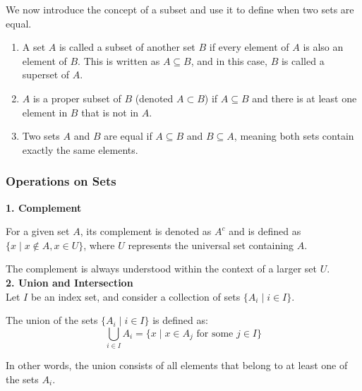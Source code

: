 We now introduce the concept of a subset and use it to define when two sets are equal.

\begin{definition} 
    \begin{enumerate}
        \item A set \( A \) is called a subset of another set \( B \) if every element of \( A \) is also an element of \( B \). This is written as \( A \subseteq B \), and in this case, \( B \) is called a superset of \( A \). 
        \item \( A \) is a proper subset of \( B \) (denoted \( A \subset B \)) if \( A \subseteq B \) and there is at least one element in \( B \) that is not in \( A \).  
        \item Two sets \( A \) and \( B \) are equal if \( A \subseteq B \) and \( B \subseteq A \), meaning both sets contain exactly the same elements.\\   
    \end{enumerate}
\end{definition}

\subsubsection{Operations on Sets}
\vspace{5pt}

\textbf{1. Complement}

\begin{definition}
    For a given set \(A\), its complement is denoted as \(A^c\) and is defined as \(\{x \mid x \notin A, x \in U\}\), where \(U\) represents the universal set containing \(A\). 
\end{definition}

The complement is always understood within the context of a larger set \(U\). \\

\textbf{2. Union and Intersection} \\

Let \(I\) be an index set, and consider a collection of sets \(\{A_i \mid i \in I\}\).

\begin{definition}
    The union of the sets \(\{A_i \mid i \in I\}\) is defined as:
\[
\bigcup_{i \in I} A_i = \{x \mid x \in A_j \text{ for some } j \in I\}
\]
\end{definition}

In other words, the union consists of all elements that belong to at least one of the sets \(A_i\). 

